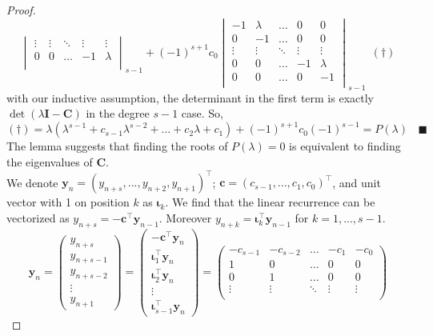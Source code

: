 \documentclass[a4paper, 10pt]{article}
\theoremstyle{definition}
\theoremstyle{hSol}
\begin{document}
\begin{proof}
$$\begin{vmatrix}
    \vdots & \vdots & \ddots & \vdots & \vdots\\
    0 & 0 & \hdots & -1 & \lambda\\
\end{vmatrix}_{s-1} + (-1)^{s+1} c_0 
\begin{vmatrix}
    -1 & \lambda & \hdots & 0 & 0\\
    0 & -1 & \hdots & 0 & 0\\
    \vdots & \vdots & \ddots & \vdots & \vdots\\
    0 & 0 & \hdots & -1 & \lambda\\
    0 & 0 & \hdots & 0 & -1\\
\end{vmatrix}_{s-1}~~(\dag)
$$
with our inductive assumption, the determinant in the first term is exactly $\det (\lambda \bm{I} - \bm{C})$ in the degree $s-1$ case. So,
$$
(\dag) = \lambda (\lambda^{s-1}+c_{s-1} \lambda^{s-2} + ... + c_2 \lambda + c_1) + (-1)^{s+1} c_0 (-1)^{s-1} = P(\lambda)~~~~\blacksquare
$$
The lemma suggests that finding the roots of $P(\lambda)=0$ is equivalent to finding the eigenvalues of $\bm{C}$. \\
We denote $\bm{y}_n = (y_{n+s}, ..., y_{n+2}, y_{n+1})^{\top}$; $\bm{c}=(c_{s-1}, ..., c_1, c_0)^{\top}$, and unit vector with 1 on position $k$ as $\bm{\iota}_k$. We find that the linear recurrence can be vectorized as $y_{n+s} = -\bm{c}^{\top} \bm{y}_{n-1}$. Moreover $y_{n+k} = \bm{\iota}_k^{\top} \bm{y}_{n-1}$ for $k=1, ..., s-1$.
$$
\bm{y}_{n} = \begin{pmatrix}
  y_{n+s} \\
  y_{n+s-1} \\
  y_{n+s-2} \\
  \vdots \\
  y_{n+1}
\end{pmatrix} = 
\begin{pmatrix}
  -\bm{c}^{\top}\bm{y}_n \\
  \bm{\iota}_{1}^{\top}\bm{y}_n \\
  \bm{\iota}_{2}^{\top}\bm{y}_n \\
  \vdots \\
  \bm{\iota}_{s-1}^{\top}\bm{y}_n
\end{pmatrix}
= 
\begin{pmatrix}
    -c_{s-1} & -c_{s-2} & \hdots & -c_1 & -c_0 \\
    1 & 0 & \hdots & 0 & 0\\
    0 & 1 & \hdots & 0 & 0\\
    \vdots & \vdots & \ddots & \vdots & \vdots\\

\end{pmatrix}$$
\end{proof}
\end{document}
